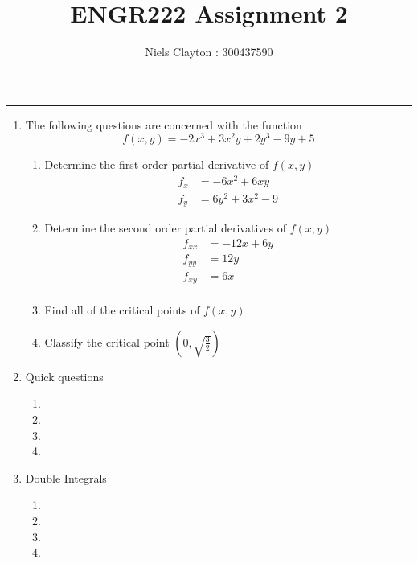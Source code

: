 \documentclass[a4paper,11pt]{article}
\begin{document}
\title{\LARGE{\textbf{ENGR222 Assignment 2}}}
\author{Niels Clayton : 300437590}
\date{}
\maketitle
\hrule

\begin{enumerate}
    \item The following questions are concerned with the function
    $$ f(x,y) = -2x^3 + 3x^2y + 2y^3 - 9y +5$$

    \begin{enumerate}
        \item Determine the first order partial derivative of $f(x, y)$
        \begin{align*}
            f_x &= -6x^2 + 6xy \\
            f_y &=  6y^2 + 3x^2 - 9
        \end{align*}
    
        \item Determine the second order partial derivatives of $f(x, y)$
        \begin{align*}
            f_{xx} &= -12x + 6y\\
            f_{yy} &= 12y \\
            f_{xy} &= 6x\\
        \end{align*}
    
        \item Find all of the critical points of $f(x, y)$
    
        \item Classify the critical point $(0,\sqrt{\frac{3}{2}})$
    
    \end{enumerate}

    \item Quick questions
    
    \begin{enumerate}
        \item 
    
        \item
    
        \item
    
        \item
    
    \end{enumerate}

    \item Double Integrals
    
    \begin{enumerate}
        \item 
    
        \item
    
        \item
    
        \item
    
    \end{enumerate}

\end{enumerate}
\end{document}
